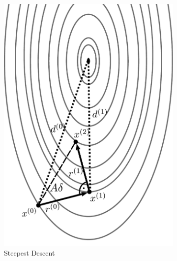 \begin{figure}
\centering
\begin{subfigure}{.5\textwidth}
  \centering
  \includegraphics[width=0.9\linewidth]{figures/steepest_descent.pdf}
  \caption{Steepest Descent}
  \label{fig:steepest_descent}
\end{subfigure}%
\begin{subfigure}{.5\textwidth}
  \centering

\end{subfigure}
\end{figure}
